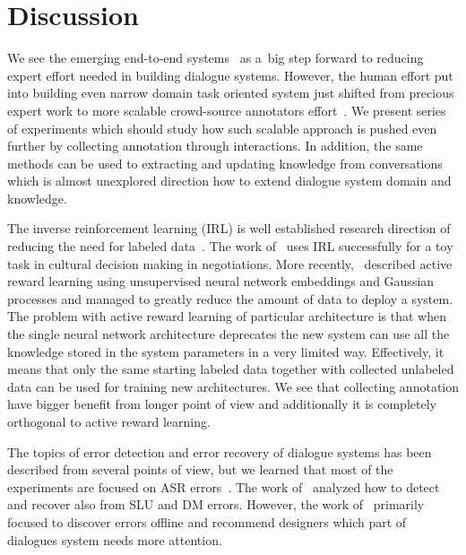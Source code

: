 \documentclass[11pt]{article}
\begin{document}
\section{Discussion}
\label{sec:discussion}

We see the emerging end-to-end systems~\cite{williams2016end,weston2015endtoend_prereq,wen_networkbased_2016} as a~big step forward to reducing expert effort needed in building dialogue systems.
However, the human effort put into building even narrow domain task oriented system just shifted from precious expert work to more scalable crowd-source annotators effort~\cite{wen_networkbased_2016,serban_building_2015}.
We present series of experiments which should study how such scalable approach is pushed even further by collecting annotation through interactions.
In addition, the same methods can be used to extracting and updating knowledge from conversations which is almost unexplored direction how to extend dialogue system domain and knowledge.

The inverse reinforcement learning (IRL) is well established research direction of reducing the need for labeled data~\cite{abbeel_apprenticeship_2004}.
The work of~\cite{nouri_cultural_2012} uses IRL successfully for a toy task in cultural decision making in negotiations.
More recently,~\cite{su2016active} described active reward learning using unsupervised neural network embeddings and Gaussian processes and managed to greatly reduce the amount of data to deploy a system.
The problem with active reward learning of particular architecture is that when the single neural network architecture deprecates the new system can use all the knowledge stored in the system parameters in a very limited way.
Effectively, it means that only the same starting labeled data together with collected unlabeled data can be used for training new architectures.
We see that collecting annotation have bigger benefit from longer point of view and additionally it is completely orthogonal to active reward learning.

The topics of error detection and error recovery of dialogue systems has been described from several points of view, but we learned that most of the experiments are focused on ASR errors~\cite{skantze_error_2007}.
The work of~\cite{meena_datadriven_2016} analyzed how to detect and recover also from SLU and DM errors.
However, the work of~\cite{meena_datadriven_2016} primarily focused to discover errors offline and recommend designers which part of dialogues system needs more attention.
\end{document}
